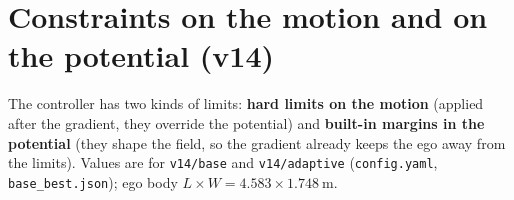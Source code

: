\documentclass[11pt,a4paper]{article}
\begin{document}
\section{Constraints on the motion and on the potential (v14)}\label{sec:constraints}
The controller has two kinds of limits: \textbf{hard limits on the motion} (applied after the gradient, they
override the potential) and \textbf{built-in margins in the potential} (they shape the field, so the gradient
already keeps the ego away from the limits). Values are for \texttt{v14/base} and \texttt{v14/adaptive}
(\texttt{config.yaml}, \texttt{base\_best.json}); ego body $L \times W = 4.583 \times 1.748~\mathrm{m}$.

\end{document}
